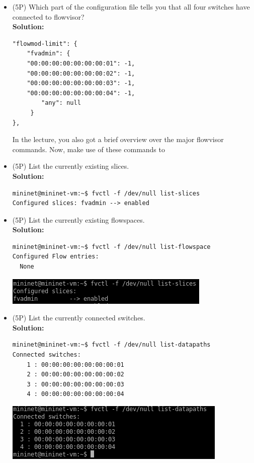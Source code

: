\documentclass{llncs}
\begin{document}
\begin{itemize}
\item (5P) Which part of the configuration file tells you that all four 
switches have connected to flowvisor? \\
\textbf{Solution: }
\begin{lstlisting}
"flowmod-limit": {
    "fvadmin": {
	"00:00:00:00:00:00:00:01": -1, 
	"00:00:00:00:00:00:00:02": -1, 
	"00:00:00:00:00:00:00:03": -1, 
	"00:00:00:00:00:00:00:04": -1, 
        "any": null
     }
}, 
\end{lstlisting}
In the lecture, you also got a brief overview over the major flowvisor commands. Now, make use of these commands to
\item (5P) List the currently existing slices.\\
\textbf{Solution: }
\begin{lstlisting}
mininet@mininet-vm:~$ fvctl -f /dev/null list-slices
Configured slices: fvadmin --> enabled
\end{lstlisting}

\item (5P) List the currently existing flowspaces. \\
\textbf{Solution: }
\begin{lstlisting}
mininet@mininet-vm:~$ fvctl -f /dev/null list-flowspace
Configured Flow entries:
  None
\end{lstlisting}
\includegraphics[scale=1]{images/8-10.png} 

\item (5P) List the currently connected switches. \\
\textbf{Solution: }
\begin{lstlisting}
mininet@mininet-vm:~$ fvctl -f /dev/null list-datapaths
Connected switches: 
	1 : 00:00:00:00:00:00:00:01
	2 : 00:00:00:00:00:00:00:02
 	3 : 00:00:00:00:00:00:00:03
 	4 : 00:00:00:00:00:00:00:04
\end{lstlisting}
\includegraphics[scale=1]{images/8-9.png} 


\end{itemize}
\end{document}
